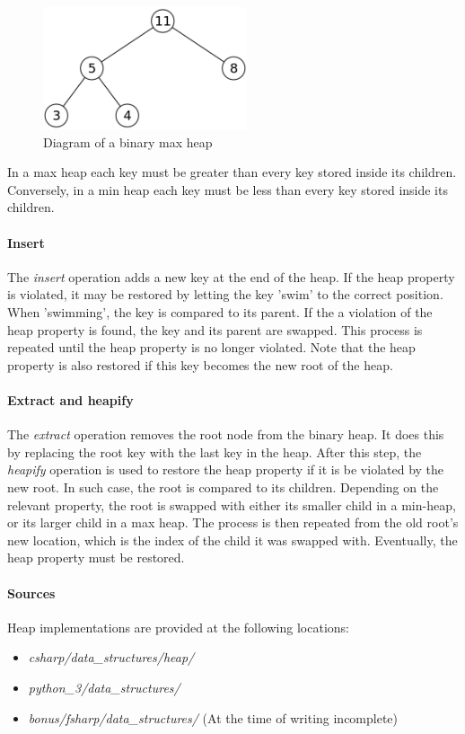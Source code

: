 \documentclass{article}
\begin{document}
\begin{figure}[H]
  \centering
  \includegraphics[width=6cm]{binary_heap}
  \caption{Diagram of a binary max heap}
\end{figure}

In a max heap each key must be greater than every key stored inside its children.
Conversely, in a min heap each key must be less than every key stored inside its children.

\paragraph{Insert}
The {\em insert} operation adds a new key at the end of the heap. If the heap property is violated,
it may be restored by letting the key 'swim' to the correct position. When 'swimming', the key
is compared to its parent. If the a violation of the heap property is found, the key and its parent
are swapped. This process is repeated until the heap property is no longer violated. Note that the
heap property is also restored if this key becomes the new root of the heap.

\paragraph{Extract and heapify}
The {\em extract} operation removes the root node from the binary heap. It does this by replacing
the root key with the last key in the heap. After this step, the {\em heapify} operation is used to
restore the heap property if it is be violated by the new root. In such case, the root is compared
to its children. Depending on the relevant property, the root is swapped with either its smaller child in a
min-heap, or its larger child in a max heap. The process is then repeated from the old root's new location,
which is the index of the child it was swapped with. Eventually, the heap property must be restored.

\paragraph{Sources}
Heap implementations are provided at the following locations:
\begin{itemize}
\item{{\em csharp/data\_structures/heap/}}
\item{{\em python\_3/data\_structures/}}
\item{{\em bonus/fsharp/data\_structures/} (At the time of writing incomplete)}
\end{itemize}
\end{document}
